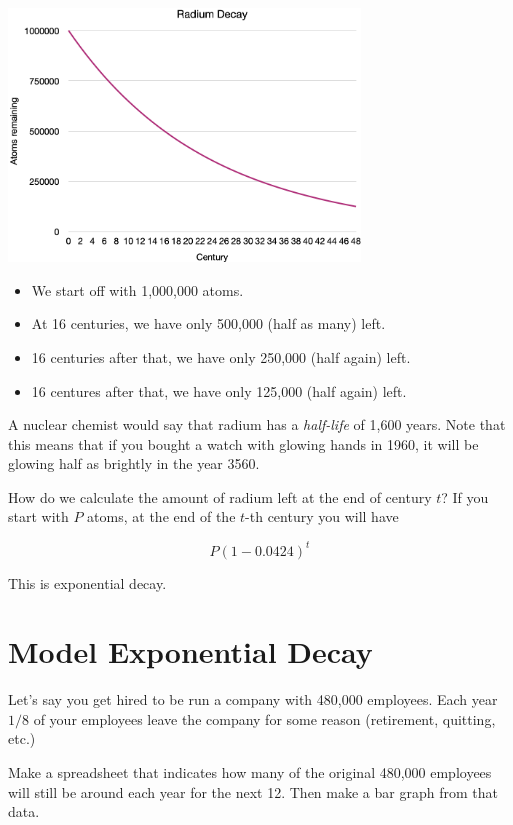 \includegraphics[width=0.7\textwidth]{radium_decay.png}
 
\begin{itemize}
\item We start off with 1,000,000 atoms.
\item At 16 centuries, we have only 500,000 (half as many) left.
\item 16 centuries after that, we have only 250,000 (half again) left.
\item 16 centures after that, we have only 125,000 (half again) left.
\end{itemize}

A nuclear chemist would say that radium has a \textit{half-life} of
1,600 years. Note that this means that if you bought a watch with
glowing hands in 1960, it will be glowing half as brightly in the year
3560.

How do we calculate the amount of radium left at the end of century
$t$? If you start with $P$ atoms, at the end of the $t$-th century you
will have

$$P\left(1 - 0.0424\right)^t$$

This is exponential decay.

\section{Model Exponential Decay}

Let's say you get hired to be run a company with 480,000
employees. Each year $1/8$ of your employees leave the company for
some reason (retirement, quitting, etc.)

Make a spreadsheet that indicates how many of the original 480,000
employees will still be around each year for the next 12.  Then make a
bar graph from that data.
